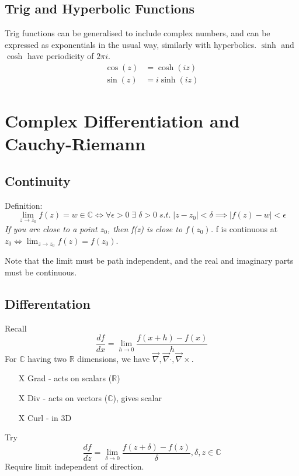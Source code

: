 \documentclass[a4paper, 11pt, normalem]{report}
\newcommand\R{\mathbb{R}}
\newcommand\C{\mathbb{C}}
\newcommand\df{\frac{df}{dx}}
\newcommand\e{\epsilon}
\newcommand\grad{\vec{\nabla}}
\begin{document}
\section{Trig and Hyperbolic Functions}
Trig functions can be generalised to include complex numbers, and can be expressed as exponentials in the usual way, similarly with hyperbolics. 
$\sinh$ and $\cosh$ have periodicity of $2\pi i$.
\begin{align}
    \cos(z) &= \cosh(iz) \\
    \sin(z) &= i\sinh(iz)
\end{align}

\chapter{Complex Differentiation and Cauchy-Riemann}
\section{Continuity}
Definition:
\begin{equation}
    \lim_{z\to z_0} f(z) = w \in \C \iff \forall \e > 0 \;\exists \;\delta > 0 \; s.t.\; |z-z_0| < \delta \implies |f(z) - w| < \e
\end{equation}
\emph{If you are close to a point $z_0$, then f(z) is close to $f(z_0)$.}
f is continuous at $z_0 \iff \lim_{z\to z_0} f(z) = f(z_0)$.

Note that the limit must be path independent, and the real and imaginary parts must be continuous. 

\section{Differentation}
Recall
\begin{equation}
    \df = \lim_{h\to 0} \frac{f(x+h) - f(x)}{h}
\end{equation}
For $\C$ having two $\R$ dimensions, we have $\grad, \grad\cdot, \grad\times$. 
\begin{itemize}
    \item[X] Grad - acts on scalars ($\R$)
    \item[X] Div - acts on vectors ($\C$), gives scalar
    \item[X] Curl - in 3D
\end{itemize}
Try 
\begin{equation}
    \frac{df}{dz} = \lim_{\delta\to 0} \frac{f(z+\delta) - f(z)}{\delta}, \delta, z \in \C
\end{equation}
Require limit independent of direction.
\end{document}
